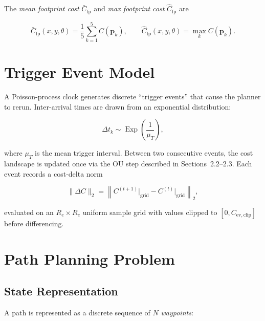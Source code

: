 \documentclass[11pt,a4paper]{article}
\begin{document}
The \emph{mean footprint cost} $\bar{C}_{\mathrm{fp}}$ and
\emph{max footprint cost} $\hat{C}_{\mathrm{fp}}$ are

\begin{equation}
  \bar{C}_{\mathrm{fp}}(x,y,\theta) = \frac{1}{5}\sum_{k=1}^{5} C(\mathbf{p}_k),
  \qquad
  \hat{C}_{\mathrm{fp}}(x,y,\theta) = \max_{k} C(\mathbf{p}_k).
\end{equation}

\section{Trigger Event Model}

A Poisson-process clock generates discrete ``trigger events'' that cause the
planner to rerun.
Inter-arrival times are drawn from an exponential distribution:

\begin{equation}
  \Delta t_k \sim \operatorname{Exp}\!\left(\frac{1}{\mu_T}\right),
\end{equation}

where $\mu_T$ is the mean trigger interval.
Between two consecutive events, the cost landscape is updated once via the
OU step described in Sections~2.2--2.3.
Each event records a cost-delta norm

\begin{equation}
  \|\Delta C\|_2 = \left\|
    C^{(t+1)}\big|_{\mathrm{grid}} - C^{(t)}\big|_{\mathrm{grid}}
  \right\|_2,
\end{equation}

evaluated on an $R_e \times R_e$ uniform sample grid with values clipped to
$[0, C_{\mathrm{ev,clip}}]$ before differencing.

\section{Path Planning Problem}

\subsection{State Representation}

A path is represented as a discrete sequence of $N$ \emph{waypoints}:
\end{document}
